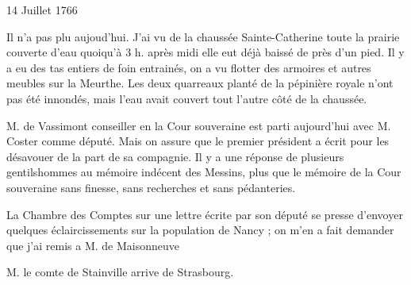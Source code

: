                      \begin{diary}{14 Juillet 1766}{}
                        
                         Il n'a pas plu aujoud'hui. J'ai vu
                           de la chaussée
                              Sainte-Catherine toute la prairie couverte d'eau
                           quoiqu'à 3 h. après midi elle eut déjà baissé
                           de près d'un pied. Il y a eu des tas entiers de
                           foin entrainés, on a vu flotter des armoires
                           et autres meubles sur la
                              Meurthe. Les deux quarreaux
                           planté de la pépinière royale n'ont
                           pas été innondés, mais l'eau avait couvert
                           tout l'autre côté de la chaussée. \bigskip
        
        
                        
                           M. de Vassimont
                           conseiller en la Cour souveraine est
                           parti aujourd'hui avec M. Coster
                           comme
                           député. Mais on assure que le
                              premier
                              président a écrit pour les désavouer de la
                           part de sa compagnie. Il y a une réponse
                           de plusieurs gentilshommes au mémoire
                              indécent des Messins, plus  que le
                              mémoire de la Cour souveraine sans finesse, sans
                           recherches et sans pédanteries. \bigskip
        
        
                        
                           La Chambre des Comptes sur une lettre écrite par son
                           député se presse d'envoyer quelques éclaircissements
                           sur la population de Nancy ; on
                           m'en a
                           fait demander que j'ai remis a M. de
                              Maisonneuve
                        \bigskip
        
        
                        
                           M. le comte de Stainville arrive
                           de Strasbourg. \bigskip
        
        
                     \end{diary}

